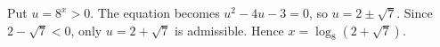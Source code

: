 Put $u=8^x>0$. The equation becomes $u^2-4u-3=0$, so $u=2\pm\sqrt7$. Since $2-\sqrt7<0$, only $u=2+\sqrt7$ is admissible. Hence $\boxed{x=\log_8(2+\sqrt7)}$.
